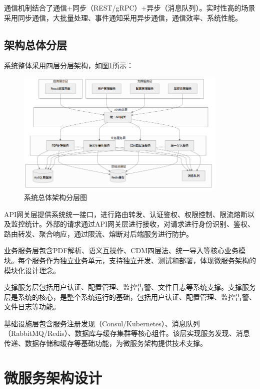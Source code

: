 通信机制结合了通信+同步（REST/gRPC）+异步（消息队列）。实时性高的场景采用同步通信，大批量处理、事件通知采用异步通信，通信效率、系统性能。

\subsection{架构总体分层}

系统整体采用四层分层架构，如图\ref{fig:system_architecture}所示：

\begin{figure}[H]
    \centering
    \includegraphics[width=0.9\textwidth]{chapters/fig-0/system_architecture_simple.png}
    \caption{系统总体架构分层图}
    \label{fig:system_architecture}
\end{figure}

API网关层提供系统统一接口，进行路由转发、认证鉴权、权限控制、限流熔断以及监控统计。外部的请求通过API网关层进行接收，对请求进行身份识别、鉴权、路由转发、聚合响应，通过限流、熔断对后端服务进行防护。

业务服务层包含PDF解析、语义互操作、CDM四层法、统一导入等核心业务模块。每个服务作为独立业务单元，支持独立开发、测试和部署，体现微服务架构的模块化设计理念。

支撑服务层包括用户认证、配置管理、监控告警、文件日志等系统支撑。支撑服务层是系统的核心，是整个系统运行的基础，包括用户认证、配置管理、监控告警、文件日志等功能。

基础设施层包含服务注册发现（Consul/Kubernetes）、消息队列（RabbitMQ/Redis）、数据库与缓存集群等核心组件。该层实现服务发现、消息传递、数据存储和缓存等基础功能，为微服务架构提供技术支撑。

\section{微服务架构设计}


